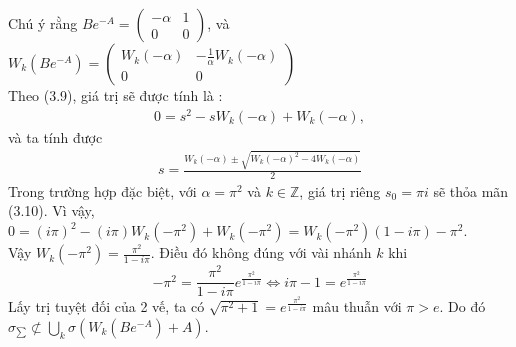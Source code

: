  Chú ý rằng $Be^{-A} = \begin{pmatrix}
 -\alpha & 1 \\
 0 & 0
 \end{pmatrix}$, và 
 $W_{k}(Be^{-A}) = \begin{pmatrix}
 W_{k}(-\alpha) & -\frac{1}{\alpha}W_{k}(-\alpha) \\
 0 & 0
 \end{pmatrix}$ \\
 Theo (3.9), giá trị sẽ được tính là :
 \begin{align}
 0 = s^{2} - sW_{k}(-\alpha) + W_{k}(-\alpha),
 \end{align}
 và ta tính được
 \begin{align}
 s = \frac{W_{k}(-\alpha) \pm \sqrt{W_{k}(-\alpha)^{2} - 4W_{k}(-\alpha)}}{2}
 \end{align}
 Trong trường hợp đặc biệt, với $\alpha = \pi^{2}$ và $k \in \mathbb{Z}$, giá trị riêng $s_{0} = \pi i$ sẽ thỏa mãn (3.10). Vì vậy, \\
 $0 = (i\pi)^{2} - (i\pi)W_{k}(-\pi^{2}) + W_{k}(-\pi^{2})
 = W_{k}(-\pi^{2})(1 - i\pi) - \pi^{2}$. \\
 Vậy $W_{k}(-\pi^{2}) = \frac{\pi^{2}}{1-i\pi}$. Điều đó không đúng với vài nhánh $k$ khi 
 $$-\pi^{2} = \frac{\pi^{2}}{1-i\pi}e^{\frac{\pi^{2}}{1-i\pi}} \Leftrightarrow i\pi - 1 = e^{\frac{\pi^{2}}{1-i\pi}}$$
 Lấy trị tuyệt đối của 2 vế, ta có $\sqrt{\pi^{2}+1} = e^{\frac{\pi^{2}}{1-i\pi}}$ mâu thuẫn với $\pi > e$. Do đó $\sigma_{\sum} \not\subset \displaystyle \bigcup_{k}\sigma(W_{k}(Be^{-A})+A)$.\\
 
